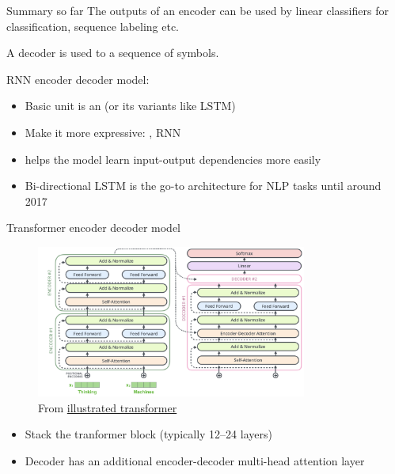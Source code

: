 \documentclass[usenames,dvipsnames,notes,11pt,aspectratio=169,hyperref={colorlinks=true, linkcolor=blue}]{beamer}
\begin{document}
\begin{frame}
    {Summary so far}
    The outputs of an encoder can be used by linear classifiers for classification, sequence labeling etc.

    A decoder is used to  a sequence of symbols.

    RNN encoder decoder model:\\
    \begin{itemize}
        \item Basic unit is an  (or its variants like LSTM)
        \item Make it more expressive: ,  RNN
        \item {} helps the model learn input-output dependencies more easily
        \item Bi-directional LSTM is the go-to architecture for NLP tasks until around 2017
    \end{itemize}
\end{frame}

\begin{frame}
    {Transformer encoder decoder model}
    \begin{figure}
        \includegraphics[height=5cm]{figures/transformer-enc-dec}
        \caption{From \href{https://jalammar.github.io/illustrated-transformer/}{illustrated transformer}}
    \end{figure}
    \vspace{-2em}

    \begin{itemize}
        \item Stack the tranformer block (typically 12--24 layers)
        \item Decoder has an additional encoder-decoder multi-head attention layer
    \end{itemize}
    \pause\vspace{-1ex}
\end{frame}
\end{document}
